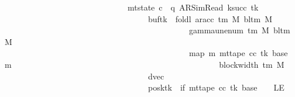 \begin{isabellebody}
\ \ \ \ \ \ \ \ \ \ \ \ \ \ \ \ \ \ \ \ \ \ \ \ \ \ \ \ \ {\isasymand}\ mt{\isacharunderscore}{\kern0pt}state\ c{\isacharprime}{\kern0pt}{\isacharprime}{\kern0pt}\ {\isacharequal}{\kern0pt}\ {\isacharparenleft}{\kern0pt}q{\isacharcomma}{\kern0pt}\ AR{\isacharunderscore}{\kern0pt}SimRead{\isacharcomma}{\kern0pt}\ k{\isacharunderscore}{\kern0pt}succ\ tk{\isacharcomma}{\kern0pt}\ {}{\isacharcomma}{\kern0pt}\isanewline
\ \ \ \ \ \ \ \ \ \ \ \ \ \ \ \ \ \ \ \ \ \ \ \ \ \ \ \ \ \ \ \ \ \ \ buf{\isacharparenleft}{\kern0pt}tk\ {\isacharcolon}{\kern0pt}{\isacharequal}{\kern0pt}\ foldl\ {\isacharparenleft}{\kern0pt}ar{\isacharunderscore}{\kern0pt}acc\ {\isacharparenleft}{\kern0pt}{\isasymGamma}{\isacharunderscore}{\kern0pt}tm\ M{\isacharparenright}{\kern0pt}\ {\isacharparenleft}{\kern0pt}bl{\isacharunderscore}{\kern0pt}tm\ M{\isacharparenright}{\kern0pt}{\isacharparenright}{\kern0pt}\isanewline
\ \ \ \ \ \ \ \ \ \ \ \ \ \ \ \ \ \ \ \ \ \ \ \ \ \ \ \ \ \ \ \ \ \ \ \ \ \ \ \ \ \ \ \ \ {\isacharparenleft}{\kern0pt}gamma{\isacharunderscore}{\kern0pt}unenum\ {\isacharparenleft}{\kern0pt}{\isasymGamma}{\isacharunderscore}{\kern0pt}tm\ M{\isacharparenright}{\kern0pt}\ {\isacharparenleft}{\kern0pt}bl{\isacharunderscore}{\kern0pt}tm\ M{\isacharparenright}{\kern0pt}\ {}{\isacharparenright}{\kern0pt}\isanewline
\ \ \ \ \ \ \ \ \ \ \ \ \ \ \ \ \ \ \ \ \ \ \ \ \ \ \ \ \ \ \ \ \ \ \ \ \ \ \ \ \ \ \ \ \ {\isacharparenleft}{\kern0pt}map\ {\isacharparenleft}{\kern0pt}{\isasymlambda}m{\isachardot}{\kern0pt}\ mt{\isacharunderscore}{\kern0pt}tape\ cc\ tk\ {\isacharparenleft}{\kern0pt}base{\isacharprime}{\kern0pt}\ {\isacharplus}{\kern0pt}\ m{\isacharparenright}{\kern0pt}{\isacharparenright}{\kern0pt}\isanewline
\ \ \ \ \ \ \ \ \ \ \ \ \ \ \ \ \ \ \ \ \ \ \ \ \ \ \ \ \ \ \ \ \ \ \ \ \ \ \ \ \ \ \ \ \ \ \ \ \ \ {\isacharbrackleft}{\kern0pt}{}{\isachardot}{\kern0pt}{\isachardot}{\kern0pt}{\isacharless}{\kern0pt}block{\isacharunderscore}{\kern0pt}width\ {\isacharparenleft}{\kern0pt}{\isasymGamma}{\isacharunderscore}{\kern0pt}tm\ M{\isacharparenright}{\kern0pt}{\isacharbrackright}{\kern0pt}{\isacharparenright}{\kern0pt}{\isacharparenright}{\kern0pt}{\isacharcomma}{\kern0pt}\isanewline
\ \ \ \ \ \ \ \ \ \ \ \ \ \ \ \ \ \ \ \ \ \ \ \ \ \ \ \ \ \ \ \ \ \ \ dvec{\isacharcomma}{\kern0pt}\isanewline
\ \ \ \ \ \ \ \ \ \ \ \ \ \ \ \ \ \ \ \ \ \ \ \ \ \ \ \ \ \ \ \ \ \ \ posk{\isacharparenleft}{\kern0pt}tk\ {\isacharcolon}{\kern0pt}{\isacharequal}{\kern0pt}\ if\ mt{\isacharunderscore}{\kern0pt}tape\ cc\ tk\ {\isacharparenleft}{\kern0pt}base{\isacharprime}{\kern0pt}\ {\isacharminus}{\kern0pt}\ {}{\isacharparenright}{\kern0pt}\ {\isacharequal}{\kern0pt}\ LE{}\isanewline

\end{isabellebody}
